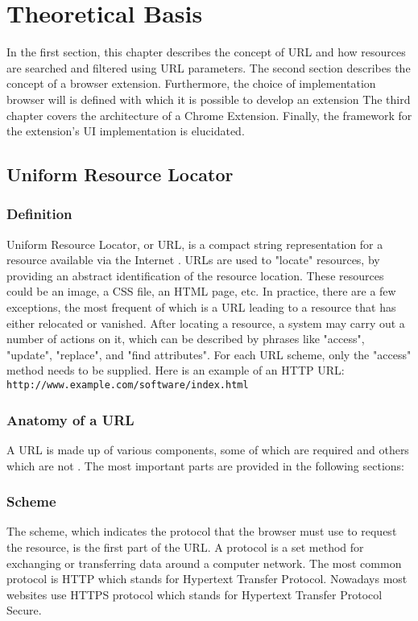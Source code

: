 \newpage
\chapter{Theoretical Basis}
In the first section, this chapter describes the concept of URL and how resources are searched and filtered using URL parameters. The second section describes the concept of a browser extension. Furthermore, the choice of implementation browser will is defined with which it is possible to develop an extension The third chapter covers the architecture of a Chrome Extension. Finally, the framework for the extension's UI implementation is elucidated.


\section{Uniform Resource Locator}

\subsection{Definition}
Uniform Resource Locator, or URL, is a compact string representation for a resource available via the Internet \autocite{berners1994uniform}. URLs are used to "locate" resources, by providing an abstract identification of the resource location. These resources could be an image, a CSS file, an HTML page, etc. In practice, there are a few exceptions, the most frequent of which is a URL leading to a resource that has either relocated or vanished. After locating a resource, a system may carry out a number of actions on it, which can be described by phrases like "access", "update", "replace", and "find attributes". For each URL scheme, only the "access" method needs to be supplied. Here is an example of an HTTP URL: \texttt{http://www.example.com/software/index.html}

\subsection{Anatomy of a URL}
A URL is made up of various components, some of which are required and others which are not \autocite{mozilla2022url}. The most important parts are provided in the following sections:

\subsection*{Scheme}
The scheme, which indicates the protocol that the browser must use to request the resource, is the first part of the URL. A protocol is a set method for exchanging or transferring data around a computer network. The most common protocol is HTTP which stands for Hypertext Transfer Protocol. Nowadays most websites use HTTPS protocol which stands for Hypertext Transfer Protocol Secure.

